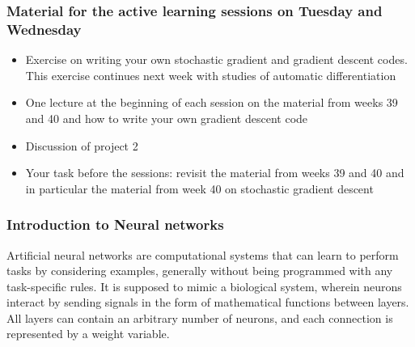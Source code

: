 \documentclass{beamer}
\begin{document}
\begin{frame}
\frametitle{Material for the active learning sessions on Tuesday and Wednesday}

\begin{itemize}
\item Exercise on writing your own stochastic gradient and gradient descent codes. This exercise continues next week with studies of automatic differentiation

\item One lecture at the beginning of each session on the material from weeks 39 and 40 and how to write your own gradient descent code

\item Discussion of project 2

\item Your task before the sessions: revisit the material from weeks 39 and 40 and in particular the material from week 40 on stochastic gradient descent
\end{itemize}

\noindent
\end{frame}

\begin{frame}
\frametitle{Introduction to Neural networks}

Artificial neural networks are computational systems that can learn to
perform tasks by considering examples, generally without being
programmed with any task-specific rules. It is supposed to mimic a
biological system, wherein neurons interact by sending signals in the
form of mathematical functions between layers. All layers can contain
an arbitrary number of neurons, and each connection is represented by
a weight variable.
\end{frame}
\end{document}
